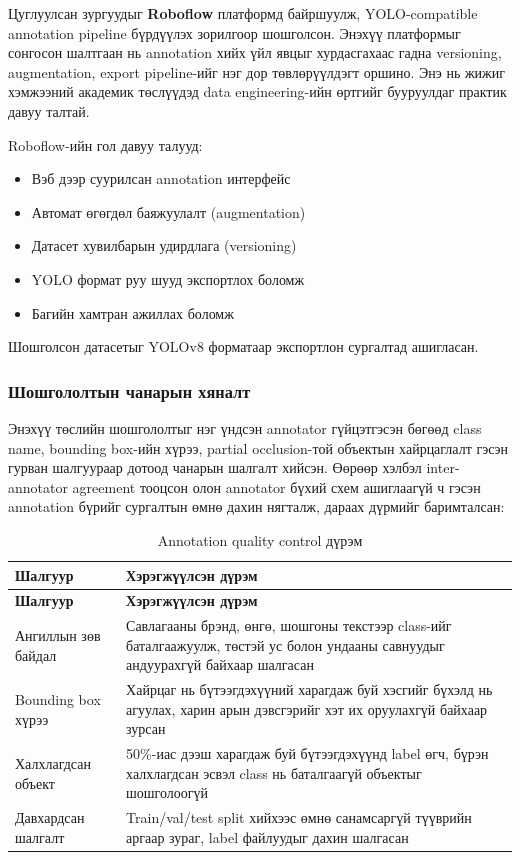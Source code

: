 Цуглуулсан зургуудыг \textbf{Roboflow} платформд байршуулж, YOLO-compatible annotation pipeline бүрдүүлэх зорилгоор шошголсон. Энэхүү платформыг сонгосон шалтгаан нь annotation хийх үйл явцыг хурдасгахаас гадна versioning, augmentation, export pipeline-ийг нэг дор төвлөрүүлдэгт оршино. Энэ нь жижиг хэмжээний академик төслүүдэд data engineering-ийн өртгийг бууруулдаг практик давуу талтай.

Roboflow-ийн гол давуу талууд:

\begin{itemize}
    \item Вэб дээр суурилсан annotation интерфейс
    \item Автомат өгөгдөл баяжуулалт (augmentation)
    \item Датасет хувилбарын удирдлага (versioning)
    \item YOLO формат руу шууд экспортлох боломж
    \item Багийн хамтран ажиллах боломж
\end{itemize}

Шошголсон датасетыг YOLOv8 форматаар экспортлон сургалтад ашигласан.

\subsubsection{Шошгололтын чанарын хяналт}

Энэхүү төслийн шошгололтыг нэг үндсэн annotator гүйцэтгэсэн бөгөөд class name, bounding box-ийн хүрээ, partial occlusion-той объектын хайрцаглалт гэсэн гурван шалгуураар дотоод чанарын шалгалт хийсэн. Өөрөөр хэлбэл inter-annotator agreement тооцсон олон annotator бүхий схем ашиглаагүй ч гэсэн annotation бүрийг сургалтын өмнө дахин нягталж, дараах дүрмийг баримталсан:

\begin{longtable}{|p{4.2cm}|p{6.8cm}|}
\caption{Annotation quality control дүрэм}
\label{tab:annotation_qc} \\
\hline
\textbf{Шалгуур} & \textbf{Хэрэгжүүлсэн дүрэм} \\
\hline
\endfirsthead
\hline
\textbf{Шалгуур} & \textbf{Хэрэгжүүлсэн дүрэм} \\
\hline
\endhead
\hline
\endfoot
Ангиллын зөв байдал & Савлагааны брэнд, өнгө, шошгоны текстээр class-ийг баталгаажуулж, төстэй ус болон ундааны савнуудыг андуурахгүй байхаар шалгасан \\
\hline
Bounding box хүрээ & Хайрцаг нь бүтээгдэхүүний харагдаж буй хэсгийг бүхэлд нь агуулах, харин арын дэвсгэрийг хэт их оруулахгүй байхаар зурсан \\
\hline
Халхлагдсан объект & 50\%-иас дээш харагдаж буй бүтээгдэхүүнд label өгч, бүрэн халхлагдсан эсвэл class нь баталгаагүй объектыг шошголоогүй \\
\hline
Давхардсан шалгалт & Train/val/test split хийхээс өмнө санамсаргүй түүврийн аргаар зураг, label файлуудыг дахин шалгасан \\
\hline
\end{longtable}

